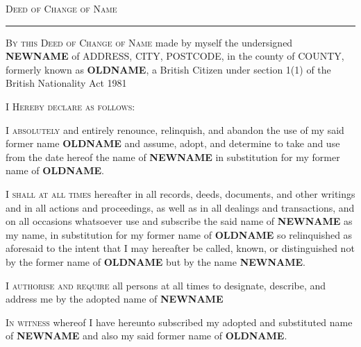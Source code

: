 \documentclass[10pt, twoside, a4paper]{article}
\renewcommand{\city}{CITY}
\renewcommand{\county}{COUNTY}
\renewcommand{\newname}{\textbf{NEWNAME}}
\renewcommand{\oldname}{\textbf{OLDNAME}}
\renewcommand{\postcode}{POSTCODE}
\renewcommand{\streetaddress}{ADDRESS}
\begin{document}


{
	\centering
	\Large
	\scshape
	Deed of Change of Name
	\vspace{14pt}
	\hrule
	\par
}

\vspace{48pt}

{\scshape By this Deed of Change of Name} made by myself the undersigned
\newname{} of \streetaddress{}, \city{}, \postcode{}, in the county of
\county{}, formerly known as \oldname{}, a British Citizen under section 1(1)
of the British Nationality Act 1981

\vspace{12pt}


{\scshape I Hereby declare as follows:}

\vspace{12pt}

	{\scshape I absolutely} and entirely renounce, relinquish, and abandon the
	use of my said former name \oldname{} and assume, adopt, and determine to
	take and use from the date hereof the name of \newname{} in substitution
	for my former name of \oldname{}.

\vspace{12pt}

	{\scshape I shall at all times} hereafter in all records, deeds, documents,
	and other writings and in all actions and proceedings, as well as in all
	dealings and transactions, and on all occasions whatsoever use and
	subscribe the said name of \newname{} as my name, in substitution for my
	former name of \oldname{} so relinquished as aforesaid to the intent that I
	may hereafter be called, known, or distinguished not by the former name of
	\oldname{} but by the name \newname{}.

\vspace{12pt}

	{\scshape I authorise and require} all persons at all times to designate,
	describe, and address me by the adopted name of \newname{}

\vspace{12pt}


{\scshape In witness} whereof I have hereunto subscribed my adopted and
substituted name of \newname{} and also my said former name of \oldname{}.
\end{document}
